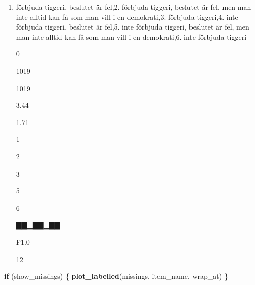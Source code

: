 \documentclass[]{book}
\newenvironment{Shaded}{\begin{snugshade}}{\end{snugshade}}
\newcommand{\KeywordTok}[1]{\textcolor[rgb]{0.13,0.29,0.53}{\textbf{#1}}}
\newcommand{\StringTok}[1]{\textcolor[rgb]{0.31,0.60,0.02}{#1}}
\newcommand{\CommentTok}[1]{\textcolor[rgb]{0.56,0.35,0.01}{\textit{#1}}}
\newcommand{\OtherTok}[1]{\textcolor[rgb]{0.56,0.35,0.01}{#1}}
\newcommand{\ControlFlowTok}[1]{\textcolor[rgb]{0.13,0.29,0.53}{\textbf{#1}}}
\newcommand{\OperatorTok}[1]{\textcolor[rgb]{0.81,0.36,0.00}{\textbf{#1}}}
\newcommand{\NormalTok}[1]{#1}
\providecommand{\tightlist}{%
  \setlength{\itemsep}{0pt}\setlength{\parskip}{0pt}}
\begin{document}
\begin{enumerate}
\def\labelenumi{\arabic{enumi}.}
\tightlist
\item
  förbjuda tiggeri, beslutet är fel,2. förbjuda tiggeri, beslutet är
  fel, men man inte alltid kan få som man vill i en demokrati,3.
  förbjuda tiggeri,4. inte förbjuda tiggeri, beslutet är fel,5. inte
  förbjuda tiggeri, beslutet är fel, men man inte alltid kan få som man
  vill i en demokrati,6. inte förbjuda tiggeri

  0

  1019

  1019

  3.44

  1.71

  1

  2

  3

  5

  6

  ▇▇▁▇▇▁▇▇

  F1.0

  12
\end{enumerate}

\begin{Shaded}
\begin{Highlighting}[]
\ControlFlowTok{if}\NormalTok{ (show_missings) \{}
  \KeywordTok{plot_labelled}\NormalTok{(missings, item_name, wrap_at)}
\NormalTok{\}}
\end{Highlighting}
\end{Shaded}

\begin{Shaded}
\end{Shaded}
\end{document}

